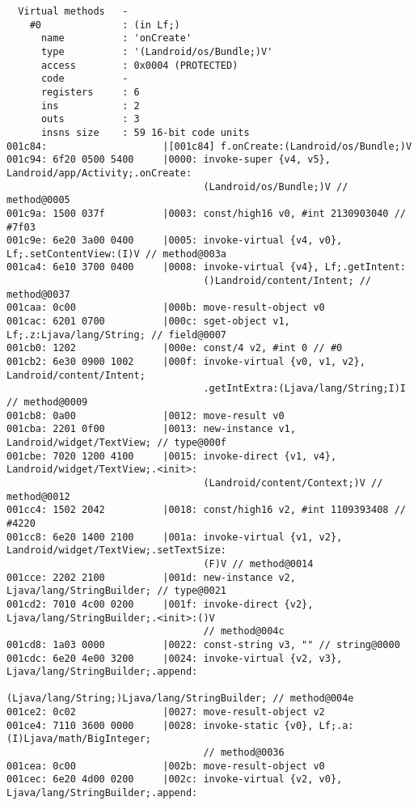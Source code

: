 \begin{lstlisting}
  Virtual methods   -
    #0              : (in Lf;)
      name          : 'onCreate'
      type          : '(Landroid/os/Bundle;)V'
      access        : 0x0004 (PROTECTED)
      code          -
      registers     : 6
      ins           : 2
      outs          : 3
      insns size    : 59 16-bit code units
001c84:                    |[001c84] f.onCreate:(Landroid/os/Bundle;)V
001c94: 6f20 0500 5400     |0000: invoke-super {v4, v5}, Landroid/app/Activity;.onCreate:
                                  (Landroid/os/Bundle;)V // method@0005
001c9a: 1500 037f          |0003: const/high16 v0, #int 2130903040 // #7f03
001c9e: 6e20 3a00 0400     |0005: invoke-virtual {v4, v0}, Lf;.setContentView:(I)V // method@003a
001ca4: 6e10 3700 0400     |0008: invoke-virtual {v4}, Lf;.getIntent:
                                  ()Landroid/content/Intent; // method@0037
001caa: 0c00               |000b: move-result-object v0
001cac: 6201 0700          |000c: sget-object v1, Lf;.z:Ljava/lang/String; // field@0007
001cb0: 1202               |000e: const/4 v2, #int 0 // #0
001cb2: 6e30 0900 1002     |000f: invoke-virtual {v0, v1, v2}, Landroid/content/Intent;
                                  .getIntExtra:(Ljava/lang/String;I)I // method@0009
001cb8: 0a00               |0012: move-result v0
001cba: 2201 0f00          |0013: new-instance v1, Landroid/widget/TextView; // type@000f
001cbe: 7020 1200 4100     |0015: invoke-direct {v1, v4}, Landroid/widget/TextView;.<init>:
                                  (Landroid/content/Context;)V // method@0012
001cc4: 1502 2042          |0018: const/high16 v2, #int 1109393408 // #4220
001cc8: 6e20 1400 2100     |001a: invoke-virtual {v1, v2}, Landroid/widget/TextView;.setTextSize:
                                  (F)V // method@0014
001cce: 2202 2100          |001d: new-instance v2, Ljava/lang/StringBuilder; // type@0021
001cd2: 7010 4c00 0200     |001f: invoke-direct {v2}, Ljava/lang/StringBuilder;.<init>:()V
                                  // method@004c
001cd8: 1a03 0000          |0022: const-string v3, "" // string@0000
001cdc: 6e20 4e00 3200     |0024: invoke-virtual {v2, v3}, Ljava/lang/StringBuilder;.append:
                                  (Ljava/lang/String;)Ljava/lang/StringBuilder; // method@004e
001ce2: 0c02               |0027: move-result-object v2
001ce4: 7110 3600 0000     |0028: invoke-static {v0}, Lf;.a:(I)Ljava/math/BigInteger;
                                  // method@0036
001cea: 0c00               |002b: move-result-object v0
001cec: 6e20 4d00 0200     |002c: invoke-virtual {v2, v0}, Ljava/lang/StringBuilder;.append:

\end{lstlisting}
